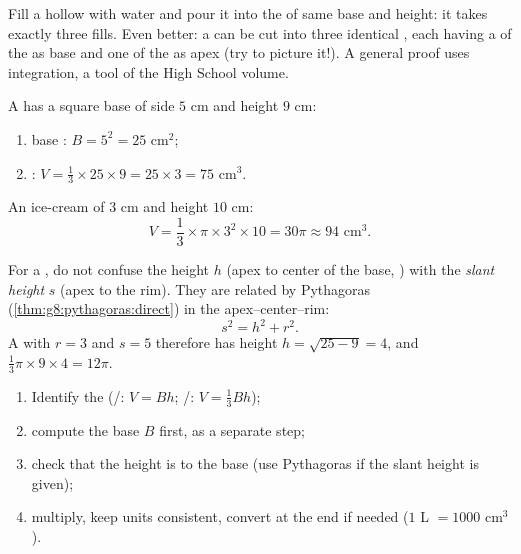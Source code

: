 \begin{remark}
Fill a hollow  with water and pour it into the  of same
base and height: it takes exactly three fills. Even better: a 
can be cut into three identical , each having a  of the
 as base and one  of the  as apex (try to picture it!).
A general proof uses integration, a tool of the High School volume.
\end{remark}

\begin{example}\label{ex:g8:solids:volume}
A  has a square base of side $5$ cm and height $9$ cm:
\begin{enumerate}
  \item base : $B = 5^2 = 25$ cm$^2$;
  \item {}: $V = \frac13 \times 25 \times 9 = 25 \times 3 = 75$
        cm$^3$.
\end{enumerate}
An ice-cream  of  $3$ cm and height $10$ cm:
\[
V = \frac13 \times \pi \times 3^2 \times 10 = 30\pi \approx 94
\text{ cm}^3 .
\]
\end{example}

\begin{example}\label{ex:g8:solids:slant}
For a , do not confuse the height $h$ (apex to center of the
base, ) with the \emph{slant height} $s$ (apex to the
rim). They are related by Pythagoras
(\cref{thm:g8:pythagoras:direct}) in the 
apex--center--rim:
\[
s^2 = h^2 + r^2 .
\]
A  with $r = 3$ and $s = 5$ therefore has height
$h = \sqrt{25 - 9} = 4$, and 
$\frac13 \pi \times 9 \times 4 = 12\pi$.
\end{example}

\begin{method}\label{met:g8:solids:method}
\begin{enumerate}
  \item Identify the  (/: $V = Bh$; /:
        $V = \frac13 Bh$);
  \item compute the base  $B$ first, as a separate step;
  \item check that the height is  to the base (use
        Pythagoras if the slant height is given);
  \item multiply, keep units consistent, convert at the end if needed
        ($1$ L $= 1000$ cm$^3$).
\end{enumerate}
\end{method}

